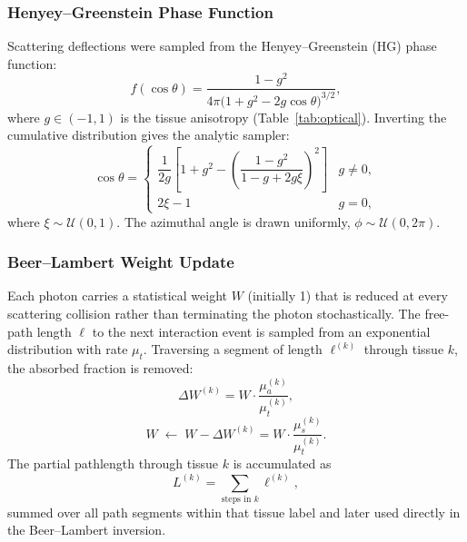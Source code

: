 \documentclass[11pt,a4paper]{article}
\begin{document}
\subsubsection*{Henyey--Greenstein Phase Function}

Scattering deflections were sampled from the Henyey--Greenstein (HG) phase function\cite{henyey1941diffuse}:
\begin{equation}
    f(\cos\theta) = \frac{1-g^2}{4\pi\bigl(1+g^2-2g\cos\theta\bigr)^{3/2}},
    \label{eq:hg}
\end{equation}
where $g \in (-1,1)$ is the tissue anisotropy (Table~\ref{tab:optical}). Inverting the cumulative distribution gives the analytic sampler:
\begin{equation}
    \cos\theta =
    \begin{cases}
    \dfrac{1}{2g}\!\left[1+g^2
    -\!\left(\dfrac{1-g^2}{1-g+2g\xi}\right)^{\!2}\right] & g \neq 0, \\[10pt]
    2\xi - 1 & g = 0,
    \end{cases}
    \label{eq:hg_sample}
\end{equation}
where $\xi \sim \mathcal{U}(0,1)$. The azimuthal angle is drawn uniformly, $\phi \sim \mathcal{U}(0,2\pi)$.

\subsubsection*{Beer--Lambert Weight Update}

Each photon carries a statistical weight $W$ (initially 1) that is reduced at every scattering collision rather than terminating the photon stochastically. The free-path length $\ell$ to the next interaction event is sampled from an exponential distribution with rate $\mu_t$. Traversing a segment of length $\ell^{(k)}$ through tissue $k$, the absorbed fraction is removed:
\begin{equation}
    \Delta W^{(k)} = W \cdot \frac{\mu_a^{(k)}}{\mu_t^{(k)}},
    \label{eq:beer_delta}
\end{equation}
\begin{equation}
    W \;\leftarrow\; W - \Delta W^{(k)} = W \cdot \frac{\mu_s^{(k)}}{\mu_t^{(k)}}.
    \label{eq:beer_update}
\end{equation}
The partial pathlength through tissue $k$ is accumulated as
\begin{equation}
    L^{(k)} = \sum_{\text{steps in }k} \ell^{(k)},
\end{equation}
summed over all path segments within that tissue label and later used directly in the Beer--Lambert inversion.
\end{document}
